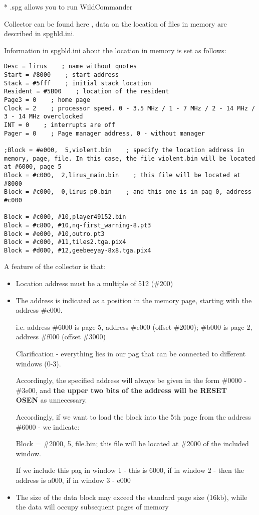 \documentclass{article}
\begin{document}
* .spg allows you to run WildCommander

Collector can be found here , data on the location of files in memory
are described in spgbld.ini.

Information in spgbld.ini about the location in memory is set as follows:

\begin{verbatim}
Desc = lirus    ; name without quotes
Start = #8000    ; start address
Stack = #5fff    ; initial stack location
Resident = #5B00    ; location of the resident
Page3 = 0    ; home page
Clock = 2    ; processor speed. 0 - 3.5 MHz / 1 - 7 MHz / 2 - 14 MHz / 3 - 14 MHz overclocked
INT = 0    ; interrupts are off
Pager = 0    ; Page manager address, 0 - without manager

;Block = #e000,  5,violent.bin    ; specify the location address in memory, page, file. In this case, the file violent.bin will be located at #6000, page 5
Block = #c000,  2,lirus_main.bin    ; this file will be located at #8000
Block = #c000,  0,lirus_p0.bin    ; and this one is in pag 0, address #c000

Block = #c000, #10,player49152.bin
Block = #c800, #10,nq-first_warning-8.pt3
Block = #e000, #10,outro.pt3
Block = #c000, #11,tiles2.tga.pix4
Block = #d000, #12,geebeeyay-8x8.tga.pix4
\end{verbatim}

A feature of the collector is that:

\begin{itemize}
\item Location address must be a multiple of 512 (\#200)
\item The address is indicated as a position in the memory page,
  starting with the address \#c000.

  i.e. address \#6000 is page 5, address \#e000 (offset \#2000);
  \#b000 is page 2, address \#f000 (offset \#3000)

  Clarification - everything lies in our pag that can be connected to
  different windows (0-3).

  Accordingly, the specified address will always be given in the form
  \#0000 - \#3e00, and
  \textbf{the upper two bits of the address will be RESET ~ OSEN}
  as unnecessary.

  Accordingly, if we want to load the block into the 5th page from the
  address \#6000 - we indicate:
      
  Block = \#2000, 5, file.bin; this file will be located at \#2000 of
  the included window.

  If we include this pag in window 1 - this is 6000, if in window 2 -
  then the address is a000, if in window 3 - e000

\item The size of the data block may exceed the standard page size
  (16kb), while the data will occupy subsequent pages of memory
\end{itemize}
\end{document}
